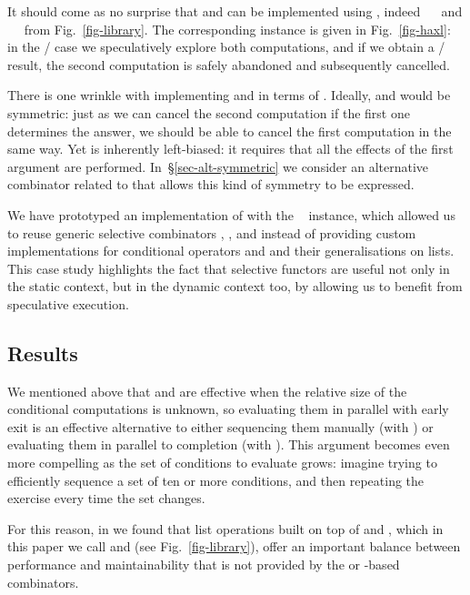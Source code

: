 It should come as no surprise that  and  can be
implemented using , indeed ~\hs{=}~\hs{(<||>)} and
~\hs{=}~\hs{(<&&>)} from Fig.~\ref{fig-library}. The corresponding
 instance is given in Fig.~\ref{fig-haxl}: in the
/ case we speculatively explore both computations,
and if we obtain a / result, the second computation is
safely abandoned and subsequently cancelled.

There is one wrinkle with implementing  and 
in terms of . Ideally,  and  would be
symmetric: just as we can cancel the second computation if the first
one determines the answer, we should be able to cancel the first
computation in the same way. Yet  is inherently left-biased:
it requires that all the effects of the first argument are performed.
In~\S\ref{sec-alt-symmetric} we consider an alternative combinator
related to  that allows this kind of symmetry to be expressed.

We have prototyped an implementation of \Haxl with the ~
instance, which allowed us to reuse generic selective combinators
\hs{<||>}, \hs{<&&>},  and  instead of providing custom
implementations for conditional operators  and  and
their generalisations on lists. This case study highlights the fact that
selective functors are useful not only in the static context, but in the dynamic
context too, by allowing us to benefit from speculative execution.

\subsection{Results}

We mentioned above that  and  are effective when the
relative size of the conditional computations is unknown, so
evaluating them in parallel with early exit is an effective
alternative to either sequencing them manually (with ) or
evaluating them in parallel to completion (with
). This argument becomes even more compelling as the
set of conditions to evaluate grows: imagine trying to efficiently
sequence a set of ten or more conditions, and then repeating the
exercise every time the set changes.

For this reason, in \Haxl we found that list operations built on top
of  and , which in this paper we call  and
 (see Fig.~\ref{fig-library}), offer an important balance
between performance and maintainability that is not provided by the
 or -based combinators.

